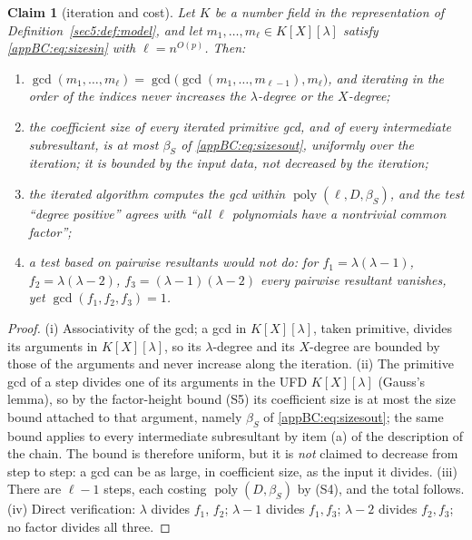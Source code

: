 \documentclass[journal]{IEEEtran}
\theoremstyle{plainn}
\newtheorem{claim}{Claim}
\theoremstyle{remark}
\newcommand{\poly}{\operatorname{poly}}
\begin{document}
\begin{claim}[iteration and cost]\label{appBC:prop:iter}\label{appBC:prop:cost}\label{appBC:rem:pairwise}
Let $K$ be a number field in the representation of Definition~\ref{sec5:def:model}, and let
$m_1,\dots,m_\ell\in K[X][\lambda]$ satisfy \eqref{appBC:eq:sizesin} with $\ell=n^{O(p)}$. Then:
\begin{enumerate}[label=(\roman*),leftmargin=*]
\item $\gcd(m_1,\dots,m_\ell)=\gcd\bigl(\gcd(m_1,\dots,m_{\ell-1}),m_\ell\bigr)$, and iterating in the
order of the indices never increases the $\lambda$-degree or the $X$-degree;
\item the coefficient size of every iterated primitive gcd, and of every intermediate subresultant, is
at most $\beta_S$ of \eqref{appBC:eq:sizesout}, \emph{uniformly} over the iteration; it is bounded by
the input data, not decreased by the iteration;
\item the iterated algorithm computes the gcd within $\poly(\ell,D,\beta_S)$, and the test ``degree
positive'' agrees with ``all $\ell$ polynomials have a nontrivial common factor'';
\item a test based on \emph{pairwise} resultants would not do: for $f_1=\lambda(\lambda-1)$,
$f_2=\lambda(\lambda-2)$, $f_3=(\lambda-1)(\lambda-2)$ every pairwise resultant vanishes, yet
$\gcd(f_1,f_2,f_3)=1$.
\end{enumerate}
\end{claim}

\begin{proof}
(i) Associativity of the gcd; a gcd in $K[X][\lambda]$, taken primitive, divides its arguments in
$K[X][\lambda]$, so its $\lambda$-degree and its $X$-degree are bounded by those of the arguments and
never increase along the iteration. (ii) The primitive gcd of a step divides one of its arguments in
the UFD $K[X][\lambda]$ (Gauss's lemma), so by the factor-height bound (S5) its coefficient size is at
most the size bound attached to that argument, namely $\beta_S$ of \eqref{appBC:eq:sizesout}; the same
bound applies to every intermediate subresultant by item (a) of the description of the chain. The bound
is therefore uniform, but it is \emph{not} claimed to decrease from step to step: a gcd can be as
large, in coefficient size, as the input it divides. (iii) There are $\ell-1$ steps, each costing
$\poly(D,\beta_S)$ by (S4), and the total follows. (iv) Direct verification: $\lambda$ divides $f_1$,
$f_2$; $\lambda-1$ divides $f_1,f_3$; $\lambda-2$ divides $f_2,f_3$; no factor divides all three.
\end{proof}
\end{document}
